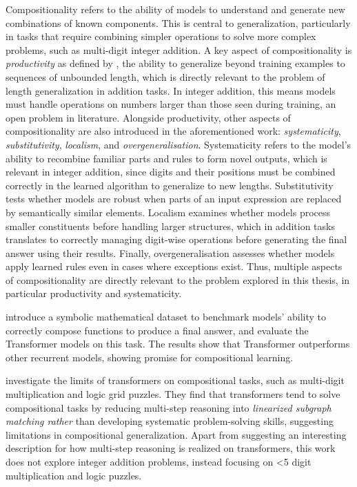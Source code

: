Compositionality refers to the ability of models to understand and generate new combinations of known components. This is central to generalization, particularly in tasks that require combining simpler operations to solve more complex problems, such as multi-digit integer addition. A key aspect of compositionality is \emph{productivity} as defined by \cite{hupkes_compositionality_2020}, the ability to generalize beyond training examples to sequences of unbounded length, which is directly relevant to the problem of length generalization in addition tasks. In integer addition, this means models must handle operations on numbers larger than those seen during training, an open problem in literature. Alongside productivity, other aspects of compositionality are also introduced in the aforementioned work: \emph{systematicity}, \emph{substitutivity}, \emph{localism}, and \emph{overgeneralisation}. Systematicity refers to the model's ability to recombine familiar parts and rules to form novel outputs, which is relevant in integer addition, since digits and their positions must be combined correctly in the learned algorithm to generalize to new lengths. Substitutivity tests whether models are robust when parts of an input expression are replaced by semantically similar elements. Localism examines whether models process smaller constituents before handling larger structures, which in addition tasks translates to correctly managing digit-wise operations before generating the final answer using their results. Finally, overgeneralisation assesses whether models apply learned rules even in cases where exceptions exist. Thus, multiple aspects of compositionality are directly relevant to the problem explored in this thesis, in particular productivity and systematicity.

\cite{saxton_analysing_2019} introduce a symbolic mathematical dataset to benchmark models' ability to correctly compose functions to produce a final answer, and evaluate the Transformer models on this task. The results show that Transformer outperforms other recurrent models, showing promise for compositional learning.

\cite{dziri_faith_2023} investigate the limits of transformers on compositional tasks, such as multi-digit multiplication and logic grid puzzles. They find that transformers tend to solve compositional tasks by reducing multi-step reasoning into \emph{linearized subgraph matching rather} than developing systematic problem-solving skills, suggesting limitations in compositional generalization. Apart from suggesting an interesting description for how multi-step reasoning is realized on transformers, this work does not explore integer addition problems, instead focusing on <5 digit multiplication and logic puzzles.

